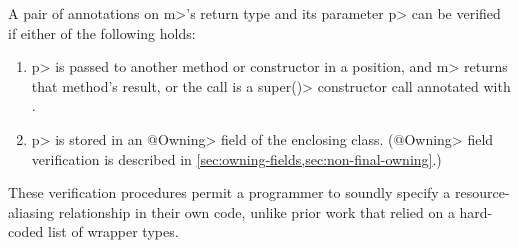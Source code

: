 A pair of \MustCallAlias annotations on
\<m>'s return type
and its parameter \<p> can be verified if either of the following holds:
\begin{enumerate}
\item \<p> is passed to another method or constructor in a
  \MustCallAlias position, and \<m> returns that method's result,
  or the call is a \<super()> constructor call annotated
  with \MustCallAlias.
\item \<p> is stored in an \<@Owning> field of the enclosing class.  (\<@Owning>
field verification is described in \cref{sec:owning-fields,sec:non-final-owning}.)
\end{enumerate}
These verification procedures permit a programmer to soundly specify a resource-aliasing
relationship in their own code, unlike prior work
that relied on a hard-coded list of wrapper types.



